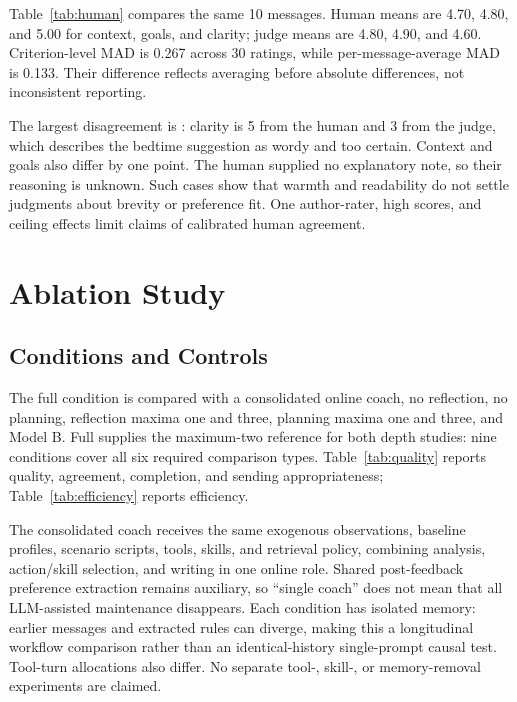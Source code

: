 \documentclass{article}
\newcommand{\code}[1]{\texttt{\detokenize{#1}}}
\begin{document}
Table~\ref{tab:human} compares the same 10 messages. Human means are 4.70, 4.80, and 5.00 for context, goals, and clarity; judge means are 4.80, 4.90, and 4.60. Criterion-level MAD is 0.267 across 30 ratings, while per-message-average MAD is 0.133. Their difference reflects averaging before absolute differences, not inconsistent reporting.

The largest disagreement is \code{case_002}: clarity is 5 from the human and 3 from the judge, which describes the bedtime suggestion as wordy and too certain. Context and goals also differ by one point. The human supplied no explanatory note, so their reasoning is unknown. Such cases show that warmth and readability do not settle judgments about brevity or preference fit. One author-rater, high scores, and ceiling effects limit claims of calibrated human agreement.

\section{Ablation Study}
\subsection{Conditions and Controls}
The full condition is compared with a consolidated online coach, no reflection, no planning, reflection maxima one and three, planning maxima one and three, and Model B. Full supplies the maximum-two reference for both depth studies: nine conditions cover all six required comparison types. Table~\ref{tab:quality} reports quality, agreement, completion, and sending appropriateness; Table~\ref{tab:efficiency} reports efficiency.

\begin{table}[t]
\caption{Nine conditions on identical case definitions. $N_m$ is the scored-message count. Agreement uses allowed actions over all 20 cases; The Appropriate column is the independent judge's appropriateness percentage over non-null messages. Quality criteria are scored 1--5.}
\label{tab:quality}\centering\small\setlength{\tabcolsep}{4pt}
\resizebox{\textwidth}{!}{}
\end{table}

The consolidated coach receives the same exogenous observations, baseline profiles, scenario scripts, tools, skills, and retrieval policy, combining analysis, action/skill selection, and writing in one online role. Shared post-feedback preference extraction remains auxiliary, so ``single coach'' does not mean that all LLM-assisted maintenance disappears. Each condition has isolated memory: earlier messages and extracted rules can diverge, making this a longitudinal workflow comparison rather than an identical-history single-prompt causal test. Tool-turn allocations also differ. No separate tool-, skill-, or memory-removal experiments are claimed.
\end{document}
